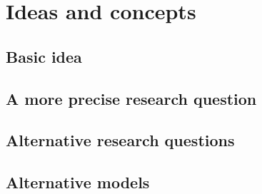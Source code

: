 \chapter{Ideas and concepts}

\section{Basic idea}

\section{A more precise research question}

\section{Alternative research questions}

\section{Alternative models}